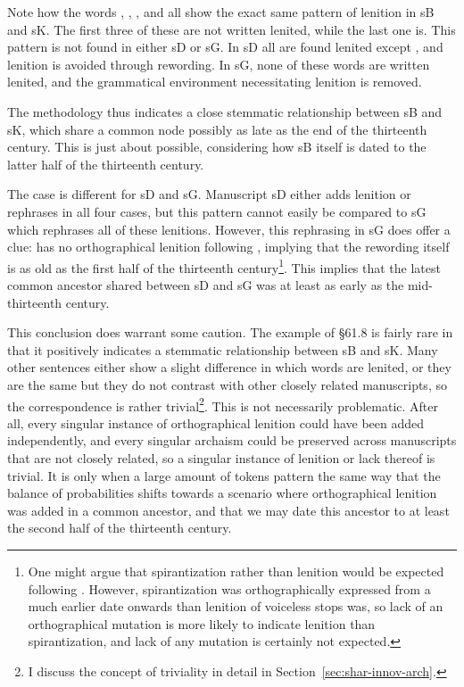 Note how the words , , , and  all show the exact same pattern of lenition in \gls{sB} and \gls{sK}. The first three of these are not written lenited, while the last one is. This pattern is not found in either \gls{sD} or \gls{sG}. In \gls{sD} all are found lenited except , and lenition is avoided through rewording. In \gls{sG}, none of these words are written lenited, and the grammatical environment necessitating lenition is removed. 

The methodology thus indicates a close stemmatic relationship between \gls{sB} and \gls{sK}, which share a common node possibly as late as the end of the thirteenth century. This is just about possible, considering how \gls{sB} itself is dated to the latter half of the thirteenth century.

The case is different for \gls{sD} and \gls{sG}. Manuscript \gls{sD} either adds lenition or rephrases in all four cases, but this pattern cannot easily be compared to \gls{sG} which rephrases all of these lenitions. However, this rephrasing in \gls{sG} does offer a clue:  has no orthographical lenition following , implying that the rewording itself is as old as the first half of the thirteenth century\footnote{%
  One might argue that spirantization rather than lenition would be expected following . However, spirantization was orthographically expressed from a much earlier date onwards than lenition of voiceless stops was, so lack of an orthographical mutation is more likely to indicate lenition than spirantization, and lack of any mutation is certainly not expected.}.
This implies that the latest common ancestor shared between \gls{sD} and \gls{sG} was at least as early as the mid-thirteenth century.

This conclusion does warrant some caution. The example of \S 61.8 is fairly rare in that it positively indicates a stemmatic relationship between \gls{sB} and \gls{sK}. Many other sentences either show a slight difference in which words are lenited, or they are the same but they do not contrast with other closely related manuscripts, so the correspondence is rather trivial\footnote{I discuss the concept of triviality in detail in Section~\ref{sec:shar-innov-arch}.}. This is not necessarily problematic. After all, every singular instance of orthographical lenition could have been added independently, and every singular archaism could be preserved across manuscripts that are not closely related, so a singular instance of lenition or lack thereof is trivial. It is only when a large amount of tokens pattern the same way that the balance of probabilities shifts towards a scenario where orthographical lenition was added in a common ancestor, and that we may date this ancestor to at least the second half of the thirteenth century.

